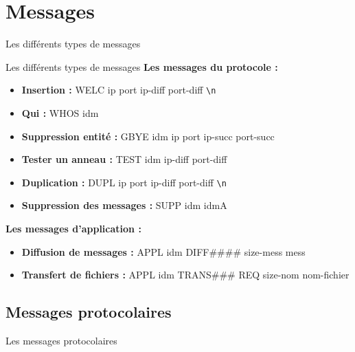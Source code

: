 \documentclass{beamer}
\newcommand*{\escape}[1]{\texttt{\textbackslash#1}}
\begin{document}
\section{Messages}
\begin{frame}
	\begin{center}
		{\Huge Les différents types de messages}
	\end{center}
\end{frame}

\begin{frame}{Les différents types de messages}
	\textbf{Les messages du protocole : }
	\begin{itemize}
		 \item<2-9> \textbf{Insertion :} WELC ip port ip-diff port-diff \escape{n}
 		 \item<3-9> \textbf{Qui :} WHOS idm
		 \item<4-9> \textbf{Suppression entité :} GBYE idm ip port ip-succ port-succ
		 \item<5-9> \textbf{Tester un anneau :} TEST idm ip-diff port-diff
		 \item<6-9> \textbf{Duplication :}  DUPL ip port ip-diff port-diff \escape{n}
		 \item<7-9> \textbf{Suppression des messages :}  SUPP idm idmA
	\end{itemize}
	\textbf{Les messages d'application : }
	\begin{itemize}
 		 \item<8-9> \textbf{Diffusion de messages :} APPL idm DIFF\#\#\#\# size-mess mess
 		 \item<9-9> \textbf{Transfert de fichiers :} APPL idm TRANS\#\#\# REQ size-nom nom-fichier
	\end{itemize}
	
\end{frame}

\subsection{Messages protocolaires}
\begin{frame}
	\begin{center}
		{\Huge Les messages protocolaires}
	\end{center}
\end{frame}
\end{document}
